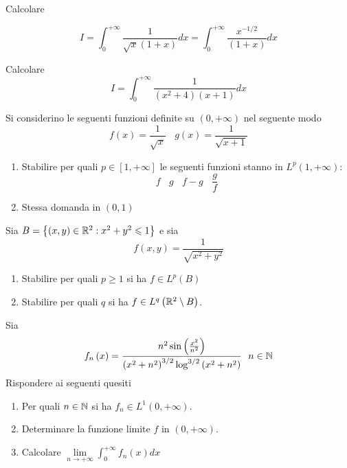 Calcolare


\begin{equation*}
I = \int ^{ + \infty }_{0}\frac{1}{\sqrt{x}\left(1 + x\right)} dx = \int ^{ + \infty }_{0}\frac{x^{ - 1/2}}{\left(1 + x\right)} dx
\end{equation*}
\Esercizio{}

Calcolare
\begin{equation*}
I = \int ^{ + \infty }_{0}\frac{1}{\left(x^{2} + 4\right)\left(x + 1\right)} dx
\end{equation*}

Si considerino le seguenti funzioni definite su $\left(0, + \infty \right)$ nel seguente modo
\begin{equation*}
f\left(x\right) = \frac{1}{\sqrt{x}} \ \ \ \ g\left(x\right) = \frac{1}{\sqrt{x + 1}}
\end{equation*}
\begin{enumerate}
\item Stabilire per quali $p\in \left[ 1, + \infty \right]$ le seguenti funzioni stanno in $L^{p}\left(1, + \infty \right)$:\begin{equation*}
f\ \ \ \ g\ \ \ \ f - g\ \ \ \ \frac{g}{f}
\end{equation*}
\item Stessa domanda in $\left(0,1\right)$
\end{enumerate}
\Esercizio{ }

Sia $B = \left\{\left(x,y\right) \in \mathbb{R} ^{2} :x^{2} + y^{2} \leqslant 1\right\}$ e sia
\begin{equation*}
f\left(x,y\right) = \frac{1}{\sqrt{x^{2} + y^{2}}}
\end{equation*}
\begin{enumerate}
\item Stabilire per quali $p\geqslant 1$ si ha $f\in L^{p}\left(B\right)$
\item Stabilire per quali $q$ si ha $f\in L^{q}\left(\mathbb{R} ^{2} \setminus B\right)$.
\end{enumerate}
\Esercizio{}

Sia
\begin{equation*}
f_{n}\left(x\right) = \frac{n^{2}\sin\left(\frac{x^{2}}{n^{2}}\right)}{\left(x^{2} + n^{2}\right)^{3/2}\log^{3/2}\left(x^{2} + n^{2}\right)} \ \ n\in \mathbb{N} 
\end{equation*}
Rispondere ai seguenti quesiti
\begin{enumerate}
\item Per quali $n\in \mathbb{N} $ si ha $f_{n} \in L^{1}\left(0, + \infty \right)$.
\item Determinare la funzione limite $f$ in $\left(0, + \infty \right)$.
\item Calcolare $\lim\limits _{n\rightarrow + \infty }\int ^{ + \infty }_{0} f_{n}\left(x\right) dx$
\end{enumerate}
\Esercizio{}

